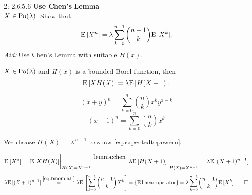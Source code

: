 \documentclass[a4paper,twoside=false,abstract=false,numbers=noenddot,
titlepage=false,headings=small,parskip=half,version=last]{scrartcl}
\begin{document}

\begin{exercise}{2: 2.6.5.6} \textbf{Use Chen's Lemma} \\
    $X \in \text{Po}(\lambda)$. Show that
    \begin{equation}
        \label{eq:expectedtopowern}
        {\rm E}\,[X^n] =
        \lambda \sum\limits_{k=0}^{n-1} \binom{n-1}{k}{\rm E}\,[X^k].
    \end{equation}
    \textit{Aid:} Use Chen's Lemma with suitable $H(x)$.
\end{exercise}
\begin{solution}
    \begin{lemma}
        \label{lemma:chen}  %
        $X \in \text{Po}(\lambda)$ and $H(x)$ is a bounded
        Borel function, then
        \begin{equation}
            \label{eq:chen}
            {\rm E}\,[XH(X)] = \lambda{\rm E}\,[H(X+1)].
        \end{equation}
    \end{lemma}
    \begin{identity}
        \label{id:binomial}
        \begin{equation}
            \label{eq:binomial}
            (x+y)^n = \sum\limits_{k=0}^n \binom{n}{k} x^ky^{n-k}
        \end{equation}
        \begin{equation}
            \label{eq:binomial1}
            (x+1)^n = \sum\limits_{k=0}^n \binom{n}{k} x^k
        \end{equation}
    \end{identity}

    We choose $H(X) = X^{n-1}$ to show \eqref{eq:expectedtopowern}.

    \begin{equation}
        {\rm E}\,[X^n] = {{\rm E}\,[XH(X)]}\bigg|_{H(X)=X^{n-1}}
        \stackrel{\eqref{lemma:chen}}{=}
        \lambda {{\rm E}\,[H(X+1)]}\bigg|_{H(X)=X^{n-1}} =
        \lambda {\rm E}\,[(X+1)^{n-1}]
    \end{equation}
    \begin{equation}
        \lambda {\rm E}\,[(X+1)^{n-1}] \stackrel{\eqref{eq:binomial1}}{=}
        \lambda {\rm E}\,
            \left[
                \sum\limits_{k=0}^{n-1} \binom{n-1}{k}X^k
            \right] =
        \left\{{\rm E}\, \text{linear operator}\right\} =
        \lambda\sum\limits_{k=0}^{n-1} \binom{n-1}{k}{\rm E}\,[X^k] \qed
    \end{equation}
\end{solution}
\pagebreak
\end{document}
